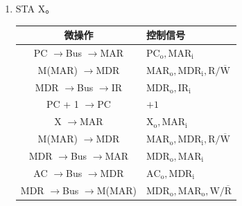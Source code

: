 \documentclass[UTF8]{report}
\newenvironment{solution}{{\noindent\hskip 2em \bf 解 \quad}}{}
\renewcommand{\to}{$\rightarrow$}
\begin{document}
\begin{solution}
\begin{enumerate}[label=(\arabic*)]
        \item STA \@ X。
        \begin{table}[htbp]
            \centering
            \begin{tabular}{cl}
                \toprule
                微操作 & 控制信号 \\
                \midrule
                PC \to Bus \to MAR        & $\mathrm{PC_o, MAR_i                   }$\\
                M(MAR) \to MDR            & $\mathrm{MAR_o, MDR_i, R/\overline{W}  }$\\
                MDR \to Bus \to IR        & $\mathrm{MDR_o, IR_i                   }$\\
                PC + 1 \to PC             & $\mathrm{+1                            }$\\
                \midrule
                X \to MAR                 & $\mathrm{X_o, MAR_i                    }$\\
                M(MAR) \to MDR            & $\mathrm{MAR_o, MDR_i, R/\overline{W}  }$\\
                MDR \to Bus \to MAR       & $\mathrm{MDR_o, MAR_i                  }$\\
                AC \to Bus \to MDR        & $\mathrm{AC_o, MDR_i                   }$\\
                MDR \to Bus \to M(MAR)    & $\mathrm{MDR_o, MAR_o, W/\overline{R}  }$\\
                \bottomrule
            \end{tabular}
        \end{table}
    \end{enumerate}
\end{solution}
\end{document}
